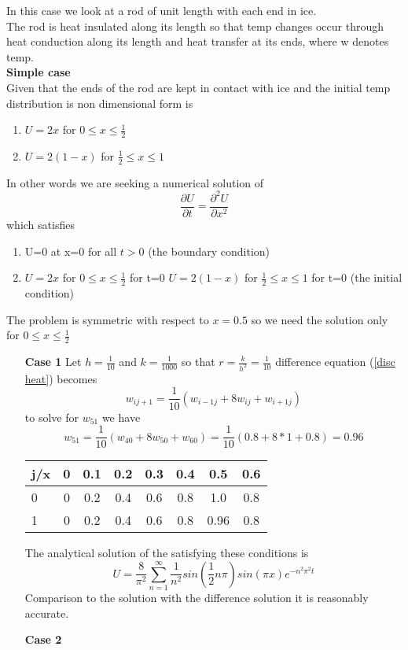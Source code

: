 \begin{example}
In this case we look at a rod of unit length with each end in ice.\\
The rod is heat insulated along its length so that temp changes occur through
heat conduction along its length and heat transfer at its ends, where w denotes
temp.\\
\textbf{Simple case}\\
Given that the ends of the rod are kept in contact with ice and the initial temp
distribution is non dimensional form is
\begin{enumerate}
\item $U=2x$ for $0\leq x \leq \frac{1}{2}$ 
\item $U=2(1-x)$ for $\frac{1}{2}\leq x \leq 1$ 
\end{enumerate}
In other words we are seeking a numerical solution of
\[\frac{\partial U}{\partial t}=\frac{\partial^2U }{\partial x^2}\]
which satisfies
\begin{enumerate}
\item U=0 at x=0 for all $t>0$ (the boundary condition)
\item $U=2x$ for $0\leq x \leq \frac{1}{2}$ for t=0
$U=2(1-x)$ for $\frac{1}{2}\leq x \leq 1$ for t=0 (the initial condition)
\end{enumerate}
The problem is symmetric with respect to $x=0.5$ so we need the solution only for $0\leq x \leq \frac{1}{2}$
\begin{enumerate}
\item[\textbf{Case 1}]
Let $h=\frac{1}{10}$ and $k=\frac{1}{1000}$ so that $r=\frac{k}{h^2}=\frac{1}{10}$
difference equation (\ref{disc heat}) becomes
\[
w_{ij+1}=\frac{1}{10}(w_{i-1j}+8w_{ij}+w_{i+1j})
\]
to solve for $w_{51}$ we have
\[w_{51}=\frac{1}{10}(w_{40}+8w_{50}+w_{60})=\frac{1}{10}(0.8+8*1+0.8)=0.96 \]
\begin{center}
\begin{tabular}{l|ccccccc}
j/x&0&0.1&0.2&0.3&0.4&0.5&0.6\\ \hline
0&0&0.2&0.4&0.6&0.8&1.0&0.8\\
1&0&0.2&0.4&0.6&0.8&0.96&0.8
\end{tabular}
\end{center}
The analytical solution of the  satisfying these conditions is
\[ U=\frac{8}{\pi^2}\sum_{n=1}^{\infty}\frac{1}{n^2}sin(\frac{1}{2}n\pi)sin(\pi x) e^{-n^2\pi^2t} \]
Comparison to the solution with the difference solution it is reasonably accurate.\\
\item[\textbf{Case 2}]

\end{enumerate}
\end{example}
